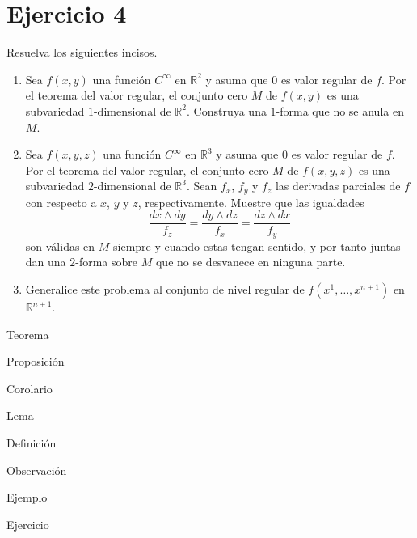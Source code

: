 \documentclass[12pt]{report}
\theoremstyle{largebreak}
\begin{document}
    \newpage

    \renewcommand{\theenumi}{\alph{enumi}}
    \renewcommand{\labelenumi}{{(\theenumi)}}

    \section{Ejercicio 4}

    \begin{excer}
        Resuelva los siguientes incisos.
        \begin{enumerate}
            \item Sea $f(x,y)$ una función $C^\infty$ en $\mathbb{R}^2$ y asuma que $0$ es valor regular de $f$. Por el teorema del valor regular, el conjunto cero $M$ de $f(x,y)$ es una subvariedad $1$-dimensional de $\mathbb{R}^2$. Construya una $1$-forma que no se anula en $M$.
            \item Sea $f(x,y,z)$ una función $C^\infty$ en $\mathbb{R}^3$ y asuma que $0$ es valor regular de $f$. Por el teorema del valor regular, el conjunto cero $M$ de $f(x,y,z)$ es una subvariedad $2$-dimensional de $\mathbb{R}^3$. Sean $f_x$, $f_y$ y $f_z$ las derivadas parciales de $f$ con respecto a $x$, $y$ y $z$, respectivamente. Muestre que las igualdades
            \begin{equation*}
                \frac{dx\wedge dy}{f_z}=\frac{dy\wedge dz}{f_x}=\frac{dz\wedge dx}{f_y}
            \end{equation*}
            son válidas en $M$ siempre y cuando estas tengan sentido, y por tanto juntas dan una $2$-forma sobre $M$ que no se desvanece en ninguna parte.
            \item Generalice este problema al conjunto de nivel regular de $f(x^1,\dots,x^{n+1})$ en $\mathbb{R}^{n+1}$.
        \end{enumerate}
    \end{excer}

    \newpage

    \begin{theor}[Nombre]
        Teorema
    \end{theor}

    \begin{propo}[Nombre]
        Proposición
    \end{propo}

    \begin{cor}[Nombre]
        Corolario
    \end{cor}

    \begin{lema}[Nombre]
        Lema
    \end{lema}

    \begin{mydef}[Nombre]
        Definición
    \end{mydef}

    \begin{obs}[Nombre]
        Observación
    \end{obs}

    \begin{exa}[Nombre]
        Ejemplo
    \end{exa}

    \begin{excer}[Nombre]
        Ejercicio
    \end{excer}
\end{document}
